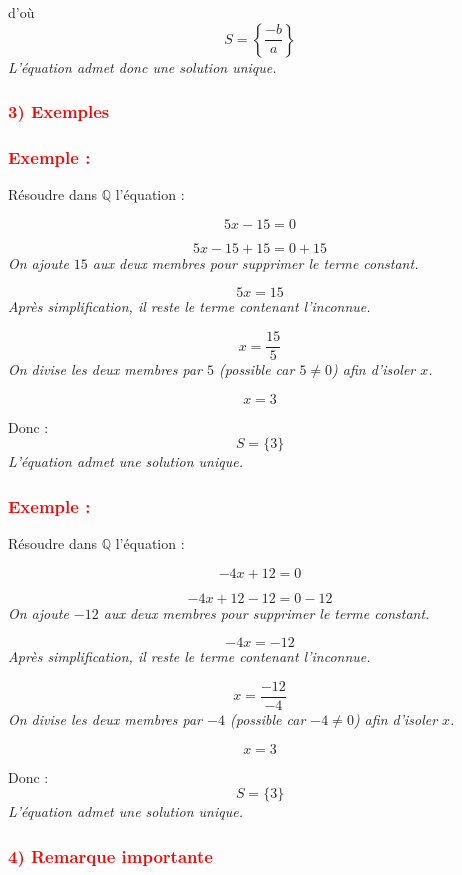 \documentclass[12pt,a4paper]{article}
\begin{document}
d’où 
\[
S = \left\{ \frac{-b}{a} \right\}
\]
\textit{L’équation admet donc une solution unique.}

\vspace{0.5cm}

\subsubsection*{\textcolor{red}{3) Exemples}}

\subsubsection*{\textcolor{red}{Exemple :}}

Résoudre dans $\mathbb{Q}$ l’équation :

\[
5x - 15 = 0
\]

\[
5x - 15 + 15 = 0 + 15
\]
\textit{On ajoute $15$ aux deux membres pour supprimer le terme constant.}

\[
5x = 15
\]
\textit{Après simplification, il reste le terme contenant l’inconnue.}

\[
x = \frac{15}{5}
\]
\textit{On divise les deux membres par $5$ (possible car $5 \neq 0$) afin d’isoler $x$.}

\[
x = 3
\]

Donc :
\[
S = \{3\}
\]
\textit{L’équation admet une solution unique.}

\subsubsection*{\textcolor{red}{Exemple :}}

Résoudre dans $\mathbb{Q}$ l’équation :

\[
-4x + 12 = 0
\]

\[
-4x + 12 - 12 = 0 - 12
\]
\textit{On ajoute $-12$ aux deux membres pour supprimer le terme constant.}

\[
-4x = -12
\]
\textit{Après simplification, il reste le terme contenant l’inconnue.}

\[
x = \frac{-12}{-4}
\]
\textit{On divise les deux membres par $-4$ (possible car $-4 \neq 0$) afin d’isoler $x$.}

\[
x = 3
\]

Donc :
\[
S = \{3\}
\]
\textit{L’équation admet une solution unique.}

\subsubsection*{\textcolor{red}{4) Remarque importante}}
\end{document}
